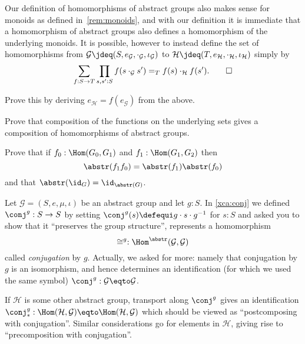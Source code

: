 \begin{remark}
  Our definition of homomorphisms of abstract groups also makes sense for monoids
  as defined in~\cref{rem:monoids}, and with our definition it is immediate that
  a homomorphism of abstract groups also defines a homomorphism of the underlying
  monoids. It is possible, however to instead define the set of homomorphisms
  from $\mathcal G \jdeq (S,e_{\mathcal G},\cdot_{\mathcal G},\iota_{\mathcal G})$
  to $\mathcal H\jdeq(T,e_{\mathcal H},\cdot_{\mathcal H},\iota_{\mathcal H})$
  simply by
  \[
    \sum_{f:S\to T}
    \prod_{s,s':S}f(s\cdot_{\mathcal G}s')=_Tf(s)\cdot_{\mathcal H}f(s').\qedhere
  \]
\end{remark}
\begin{xca}
  Prove this by deriving $e_{\mathcal H}=f(e_{\mathcal G})$ from the above.
\end{xca}

\begin{xca}
Prove that composition of the functions on the underlying sets gives a composition of homomorphisms of abstract groups.

  Prove that if $f_0:\Hom(G_0,G_1)$ and $f_1:\Hom(G_1,G_2)$ then
$$\abstr(f_1f_0)=\abstr(f_1)\abstr(f_0)$$ and that $\abstr(\id_G)=\id_{\abstr(G)}$.
\end{xca}

\begin{example}
  \label{ex:conjhomo}
  Let $\mathcal G=(S,e,\mu,\iota)$ be an abstract group and let $g:S$.  In \cref{xca:conj} we defined $\conj^g:S\to S$ by setting $\conj^g(s)\defequi g\cdot s\cdot g^{-1}$ for $s:S$ and asked you to show that it ``preserves the group structure'', \ie represents a homomorphism
  \[
    \cong^g:\Hom^\abstr(\mathcal G,\mathcal G)
  \]
  called \emph{conjugation} by $g$.
  Actually, we asked for more: namely that conjugation by $g$ is 
  an isomorphism, and hence determines an identification
  (for which we used the same symbol) $\conj^g:\mathcal G\eqto\mathcal G$.

  If $\mathcal H$ is some other abstract group, transport along $\conj^g$
  gives an identification
  $\conj^g_*:\Hom(\mathcal H,\mathcal G) \eqto \Hom(\mathcal H,\mathcal G)$
  which should be viewed as ``postcomposing with conjugation''.
  Similar considerations go for elements in $\mathcal H$,
  giving rise to ``precomposition with conjugation''.
\end{example}


